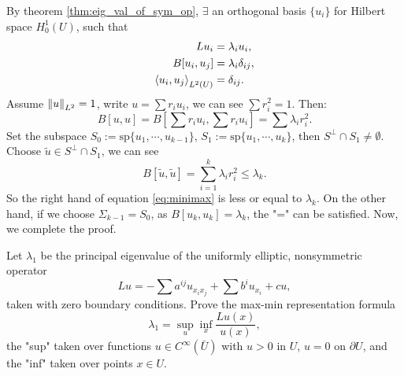\begin{solution}
    By theorem \ref{thm:eig_val_of_sym_op}, $\exists$ an orthogonal basis $\{u_{i}\}$ for Hilbert space $H_{0}^{1}(U)$, such that 
    \begin{equation}
        \begin{aligned}
            Lu_{i}&=\lambda_{i}u_{i},\\
            B[u_{i},u_{j}]&=\lambda_{i}\delta_{ij},\\
            \left<u_{i},u_{j}\right>_{L^{2}(U)}&=\delta_{ij}.\\
        \end{aligned}
    \end{equation} 
    Assume $\left\|u\right\|_{L^{2}}=1$, write $u=\sum r_{i}u_{i}$, we can see $\sum r_{i}^{2}=1$. Then:
    \begin{equation}
        B[u,u]=B\left[\sum r_{i}u_{i},\sum r_{i}u_{i}\right]=\sum\lambda_{i}r_{i}^{2}.
    \end{equation}
    Set the subspace $S_{0}:=\text{sp}\{u_{1},\cdots,u_{k-1}\}$, $S_{1}:=\text{sp}\{u_{1},\cdots,u_{k}\}$, then $S^{\bot}\cap S_{1}\neq\emptyset$. Choose $\tilde{u}\in S^{\bot}\cap S_{1}$, we can see 
    \begin{equation}
        B[\tilde{u},\tilde{u}]=\sum_{i=1}^{k}\lambda_{i}r_{i}^{2}\le\lambda_{k}.
    \end{equation}
    So the right hand of equation \eqref{eq:minimax} is less or equal to $\lambda_{k}$. On the other hand, if we choose $\Sigma_{k-1}=S_{0}$, as $B[u_{k},u_{k}]=\lambda_{k}$, the "=" can be satisfied. Now, we complete the proof.
\end{solution}
\begin{exercise}
    Let $\lambda_{1}$ be the principal eigenvalue of the uniformly elliptic, nonsymmetric operator
    \begin{equation}
        Lu=-\sum a^{ij}u_{x_{i}x_{j}}+\sum b^{i}u_{x_{i}}+cu,
    \end{equation}
    taken with zero boundary conditions. Prove the max-min representation formula 
    \begin{equation}
        \lambda_{1}=\sup_{u}\inf_{x}\frac{Lu(x)}{u(x)},
    \end{equation}
    the "sup" taken over functions $u\in C^{\infty}(\bar{U})$ with $u>0$ in $U$, $u=0$ on $\partial U$, and the "inf" taken over points $x\in U$.
\end{exercise}
